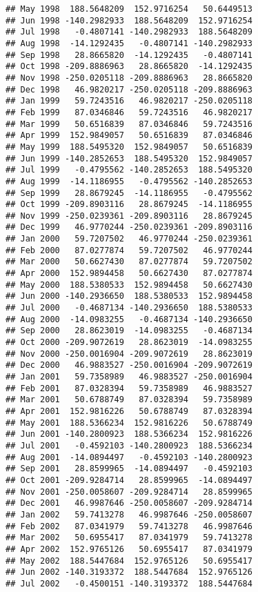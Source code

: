 \documentclass[]{article}
\begin{document}
\begin{verbatim}
## May 1998  188.5648209  152.9716254   50.6449513
## Jun 1998 -140.2982933  188.5648209  152.9716254
## Jul 1998   -0.4807141 -140.2982933  188.5648209
## Aug 1998  -14.1292435   -0.4807141 -140.2982933
## Sep 1998   28.8665820  -14.1292435   -0.4807141
## Oct 1998 -209.8886963   28.8665820  -14.1292435
## Nov 1998 -250.0205118 -209.8886963   28.8665820
## Dec 1998   46.9820217 -250.0205118 -209.8886963
## Jan 1999   59.7243516   46.9820217 -250.0205118
## Feb 1999   87.0346846   59.7243516   46.9820217
## Mar 1999   50.6516839   87.0346846   59.7243516
## Apr 1999  152.9849057   50.6516839   87.0346846
## May 1999  188.5495320  152.9849057   50.6516839
## Jun 1999 -140.2852653  188.5495320  152.9849057
## Jul 1999   -0.4795562 -140.2852653  188.5495320
## Aug 1999  -14.1186955   -0.4795562 -140.2852653
## Sep 1999   28.8679245  -14.1186955   -0.4795562
## Oct 1999 -209.8903116   28.8679245  -14.1186955
## Nov 1999 -250.0239361 -209.8903116   28.8679245
## Dec 1999   46.9770244 -250.0239361 -209.8903116
## Jan 2000   59.7207502   46.9770244 -250.0239361
## Feb 2000   87.0277874   59.7207502   46.9770244
## Mar 2000   50.6627430   87.0277874   59.7207502
## Apr 2000  152.9894458   50.6627430   87.0277874
## May 2000  188.5380533  152.9894458   50.6627430
## Jun 2000 -140.2936650  188.5380533  152.9894458
## Jul 2000   -0.4687134 -140.2936650  188.5380533
## Aug 2000  -14.0983255   -0.4687134 -140.2936650
## Sep 2000   28.8623019  -14.0983255   -0.4687134
## Oct 2000 -209.9072619   28.8623019  -14.0983255
## Nov 2000 -250.0016904 -209.9072619   28.8623019
## Dec 2000   46.9883527 -250.0016904 -209.9072619
## Jan 2001   59.7358989   46.9883527 -250.0016904
## Feb 2001   87.0328394   59.7358989   46.9883527
## Mar 2001   50.6788749   87.0328394   59.7358989
## Apr 2001  152.9816226   50.6788749   87.0328394
## May 2001  188.5366234  152.9816226   50.6788749
## Jun 2001 -140.2800923  188.5366234  152.9816226
## Jul 2001   -0.4592103 -140.2800923  188.5366234
## Aug 2001  -14.0894497   -0.4592103 -140.2800923
## Sep 2001   28.8599965  -14.0894497   -0.4592103
## Oct 2001 -209.9284714   28.8599965  -14.0894497
## Nov 2001 -250.0058607 -209.9284714   28.8599965
## Dec 2001   46.9987646 -250.0058607 -209.9284714
## Jan 2002   59.7413278   46.9987646 -250.0058607
## Feb 2002   87.0341979   59.7413278   46.9987646
## Mar 2002   50.6955417   87.0341979   59.7413278
## Apr 2002  152.9765126   50.6955417   87.0341979
## May 2002  188.5447684  152.9765126   50.6955417
## Jun 2002 -140.3193372  188.5447684  152.9765126
## Jul 2002   -0.4500151 -140.3193372  188.5447684

\end{verbatim}
\end{document}
